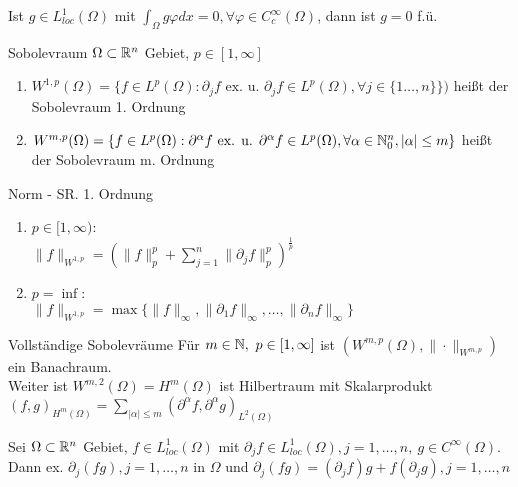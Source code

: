 \begin{korrolar}
    Ist \(g\in L_{loc}^1(\Omega)\) mit \(\int_\Omega g\varphi dx = 0,
    \forall \varphi \in C_c^\infty(\Omega)\), dann ist \(g=0\) f.ü.
\end{korrolar}
    
\begin{definition}{Sobolevraum}
    \(\Omega \subset \mathbb{R}^n\) Gebiet, \(p \in [1,\infty]\)
    \begin{enumerate}[label=(\roman*)]
        \item \(W^{1,p}(\Omega) = \{
            f\in L^p(\Omega):\partial_jf\text{ ex. u. } \partial_j f
            \in L^p(\Omega),\forall j\in\{1\dots,n\}\})\) heißt der Sobolevraum
            1. Ordnung
        \item \(W^{m,p}(\Omega) = \{f\in L^p(\Omega):\partial^\alpha f 
            \text{ ex. u. } \partial^\alpha f \in L^p(\Omega),
            \forall\alpha\in\mathbb{N}_0^n, |\alpha|\leq m\}\) heißt der Sobolevraum
            m. Ordnung
    \end{enumerate}
\end{definition}

\begin{definition}{Norm - SR. 1. Ordnung}

    \begin{enumerate}[label=(\roman*)]
        \item \(p\in [1,\infty)\):\\
            \( \|f\|_{W^{1,p}} = (\|f\|_p^p +
            \sum_{j=1}^{n}\|\partial_jf\|_p^p)^{\frac{1}{p}} \)
        \item \(p = \inf\):\\
            \( \|f\|_{W^{1,p}} =
            \max\{\|f\|_\infty, \|\partial_1f\|_\infty, \dots,
            \|\partial_nf\|_\infty\} \)
    \end{enumerate}
\end{definition}

\begin{satz}{Vollständige Sobolevräume}
    Für \(m \in \mathbb{N},\ p\in [1,\infty]\) ist
    \((W^{m,p}(\Omega),\|\cdot\|_{W^{m,p}})\) ein Banachraum.\\
    Weiter ist \(W^{m,2}(\Omega)=H^m(\Omega)\) ist Hilbertraum mit Skalarprodukt
    \((f,g)_{H^m(\Omega)}=\sum_{|\alpha|\leq m}
    (\partial^\alpha f,\partial^\alpha g)_{L^2(\Omega)}\)
\end{satz}

\begin{lemma}
    Sei \(\Omega \subset \mathbb{R}^n\) Gebiet, \(f\in L_{loc}^1(\Omega)\) mit
    \(\partial_jf\in L_{loc}^1(\Omega), j=1,\dots,n,\ g\in
    C^\infty(\Omega)\).
    Dann ex. \(\partial_j(fg), j=1,\dots,n\) in \(\Omega\) und 
    \(\partial_j(fg)= (\partial_jf)g + f(\partial_jg), j=1,\dots,n\)
\end{lemma}

